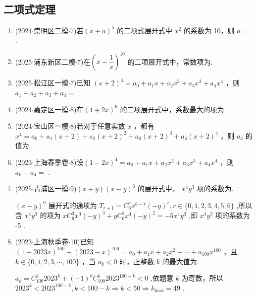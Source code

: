 \subsection*{二项式定理}
\begin{enumerate}
    \item (2024$\cdot$崇明区二模$\cdot$7)若$(x+a)^{5}$ 的二项式展开式中 ${x}^{2}$ 的系数为 10，则 $a =$ .

    \item (2025$\cdot$浦东新区二模$\cdot$7)在$\left(x - \dfrac{1}{x}\right)^{10}$ 的二项展开式中，常数项为.

    \item (2025$\cdot$松江区一模$\cdot$7)已知 ${\left( x + 2\right) }^{4} = {a}_{0} + {a}_{1}x + {a}_{2}{x}^{2} + {a}_{3}{x}^{3} + {a}_{4}{x}^{4}$ ，则 ${a}_{1} + {a}_{2} + {a}_{3} + {a}_{4} =$ .

    \item (2024$\cdot$嘉定区一模$\cdot$8)在$(1+2x)^{6}$ 的二项展开式中，系数最大的项为.

    \item (2024$\cdot$宝山区一模$\cdot$8)若对于任意实数 $x$ ，都有 ${x}^{4} = {a}_{0} + {a}_{1}\left( {x + 2}\right)  + {a}_{2}{\left( x + 2\right) }^{2} + {a}_{3}{\left( x + 2\right) }^{3} +  {a}_{4}{\left( x + 2\right) }^{4}$ ，则 ${a}_{3}$ 的值为.

    \item (2023$\cdot$上海春季卷$\cdot$8)设$(1-2x)^4 = {a}_{0} + {a}_{1}x + {a}_{2}{x}^{2} + {a}_{3}{x}^{3} + {a}_{4}{x}^{4}$ ，则 ${a}_{0} + {a}_{4} =$ .

    \item (2025$\cdot$青浦区一模$\cdot$9)$(x + y)(x - y)^{6}$ 的展开式中， ${x}^{4}{y}^{3}$ 项的系数为.
    \begin{jieda}
        ${\left( x - y\right) }^{6}$ 展开式的通项为 ${T}_{r + 1} = {{C}}_{6}^{r}{x}^{6 - r}{\left( -y\right) }^{r},r \in  \{ 0,1,2,3,4,5,6\}$ ,所以含 ${x}^{4}{y}^{3}$ 的项为 $x{{C}}_{6}^{3}{x}^{3}{\left( -y\right) }^{3} + y{{C}}_{6}^{2}{x}^{4}  {\left( -y\right) }^{2} =  - 5{x}^{4}{y}^{3}$ ,即 ${x}^{4}{y}^{3}$ 项的系数为 -5 .
    \end{jieda}

    \item (2023$\cdot$上海秋季卷$\cdot$10)已知$(1+2023x)^{100} + {\left( {2023} - x\right) }^{100} = {a}_{0} + {a}_{1}x + {a}_{2}{x}^{2} + \cdots  + {a}_{100}{x}^{100}$ ，且 $k \in  \{ 0,1,2,3,\cdots ,{100}\}$ ，当 ${a}_{k} < 0$ 时，正整数 $k$ 的最大值为.
    \begin{jieda}
        ${a}_{k} = {{C}}_{100}^{k}{2023}^{k} + {\left( -1\right) }^{k}{{C}}_{100}^{k}{2023}^{{100} - k} < 0$ ,依题意 $k$ 为奇数，所以 ${2023}^{k} < {2023}^{{100} - k},k < {100} - k \Longrightarrow  k < {50} \Longrightarrow  {k}_{\max } = {49}$ .
    \end{jieda}


\end{enumerate}
